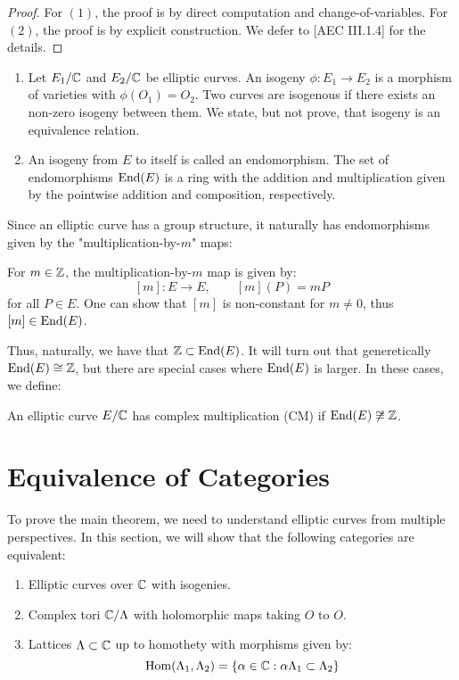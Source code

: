 \documentclass[12pt]{article}
\begin{document}
\begin{proof}
    For $(1)$, the proof is by direct computation and change-of-variables. For $(2)$, the proof is by explicit construction. We defer to [AEC III.1.4] for the details.
\end{proof}

\begin{definition}
    \begin{enumerate}
        \item Let $E_1/\mathbb C$ and $E_2/\mathbb C$ be elliptic curves. An isogeny $\phi: E_1 \to E_2$ is a morphism of varieties with $\phi(O_1) = O_2$. Two curves are isogenous if there exists an non-zero isogeny between them. We state, but not prove, that isogeny is an equivalence relation.
        \item An isogeny from $E$ to itself is called an endomorphism. The set of endomorphisms $\operatorname{End}(E)$ is a ring with the addition and multiplication given by the pointwise addition and composition, respectively.
    \end{enumerate}    
\end{definition}


Since an elliptic curve has a group structure, it naturally has endomorphisms given by the "multiplication-by-$m$" maps:
\begin{definition}
    For $m \in \mathbb Z$, the multiplication-by-$m$ map is given by:
    \[ [m]: E \to E, \qquad [m](P) = mP\]
    for all $P \in E$. One can show that $[m]$ is non-constant for $m \ne 0$, thus $[m] \in \operatorname{End}(E)$.
\end{definition}

Thus, naturally, we have that $\mathbb Z \subset \operatorname{End}(E)$. It will turn out that generetically $\operatorname{End}(E) \cong \mathbb Z$, but there are special cases where $\operatorname{End}(E)$ is larger. In these cases, we define: 

\begin{definition}
    An elliptic curve $E/\mathbb C$ has complex multiplication (CM) if $\operatorname{End}(E) \not \cong \mathbb Z$.
\end{definition}

\section{Equivalence of Categories}
To prove the main theorem, we need to understand elliptic curves from multiple perspectives. In this section, we will show that the following categories are equivalent:
\begin{enumerate}
    \item Elliptic curves over $\mathbb C$ with isogenies.
    \item Complex tori $\mathbb C/\Lambda$ with holomorphic maps taking $O$ to $O$.
    \item Lattices $\Lambda \subset \mathbb C$ up to homothety with morphisms given by:
    \[ \operatorname{Hom}(\Lambda_1, \Lambda_2) = \{\alpha \in \mathbb C: \alpha \Lambda_1 \subset \Lambda_2\}\]
\end{enumerate}
\end{document}
